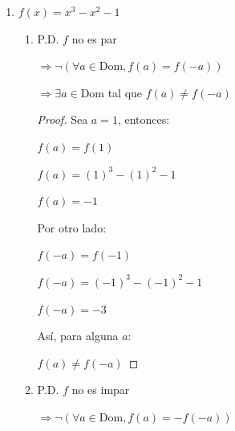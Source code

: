\documentclass{article}
\begin{document}
\begin{enumerate}
\begin{enumerate}
\begin{enumerate}
\begin{proof}
                \(-f(-a) = -(-7 + 1)\)
                
                \(-f(-a) = 6\)
                \vspace{\baselineskip}
                
                Por tanto, para alguna \(a\):
                
                \(f(a) \neq -f(-a)\)
                \end{proof}
            \end{enumerate}
            \vspace{\baselineskip}

        \item[e)] \(f(x) = x^3 - x^2 - 1\)
            \begin{enumerate}
                \item[1.] P.D. \( f \) no es par
                
                \(\Rightarrow \neg(\forall a \in \text{Dom}, f(a) = f(-a))\)
                
                \(\Rightarrow \exists a \in \text{Dom}\) tal que \(f(a) \neq f(-a)\)
                
                \begin{proof} Sea \(a = 1\), entonces:
                
                \(f(a) = f(1)\)
                
                \(f(a) = (1)^3 - (1)^2 - 1\)
                
                \(f(a) = -1\)
                \vspace{\baselineskip}
                
                Por otro lado:
                
                \(f(-a) = f(-1)\)
                
                \(f(-a) = (-1)^3 - (-1)^2 - 1\)
                
                \(f(-a) = -3\)
                \vspace{\baselineskip}
                
                Así, para alguna \(a\):
                
                \(f(a) \neq f(-a)\)
                \end{proof}
                
                \item[2.] P.D. \( f \) no es impar
                
                \(\Rightarrow \neg(\forall a \in \text{Dom}, f(a) = -f(-a))\)
                

\end{enumerate}
\end{enumerate}
\end{enumerate}
\end{document}
